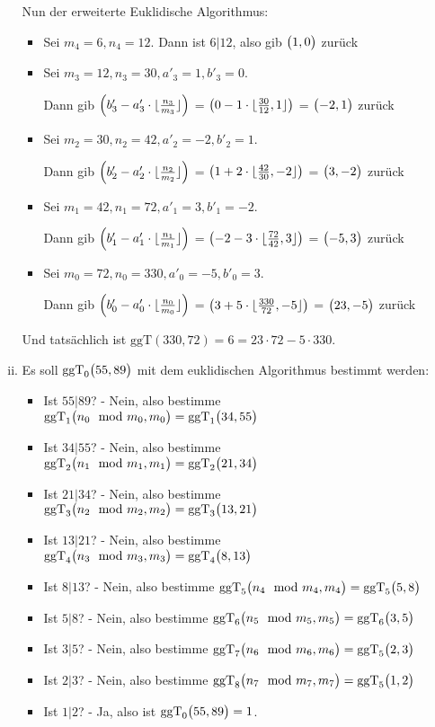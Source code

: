 \documentclass{scrreprt}
\newcommand{\ggT}[0]{\text{ggT}}
\DeclarePairedDelimiter{\floor}{\lfloor}{\rfloor}
\begin{document}
\begin{enumerate}[(a)]
\begin{enumerate}[(i)]
    Nun der erweiterte Euklidische Algorithmus:
    \begin{itemize}
    \item Sei $m_4 = 6, n_4 = 12$.
      Dann ist $6|12$, also gib $\qty\big(1, 0)$ zurück
    \item Sei $m_3 = 12, n_3 = 30, a'_3 = 1, b'_3 = 0$.

      Dann gib $\qty(b'_3 - a'_3 \cdot \floor{\frac{n_3}{m_3}})$ =
      $\qty(0 - 1 \cdot \floor{\frac{30}{12}, 1})$ =
      $\qty\big(-2, 1)$ zurück
    \item Sei $m_2 = 30, n_2 = 42, a'_2 = -2, b'_2 = 1$.

      Dann gib $\qty(b'_2 - a'_2 \cdot \floor{\frac{n_2}{m_2}})$ =
      $\qty(1 + 2 \cdot \floor{\frac{42}{30}, -2})$ =
      $\qty\big(3, -2)$ zurück
    \item Sei $m_1 = 42, n_1 = 72, a'_1 = 3, b'_1 = -2$.

      Dann gib $\qty(b'_1 - a'_1 \cdot \floor{\frac{n_1}{m_1}})$ =
      $\qty(-2 - 3 \cdot \floor{\frac{72}{42}, 3})$ =
      $\qty\big(-5, 3)$ zurück
    \item Sei $m_0 = 72, n_0 = 330, a'_0 = -5, b'_0 = 3$.

      Dann gib $\qty(b'_0 - a'_0 \cdot \floor{\frac{n_0}{m_0}})$ =
      $\qty(3 + 5 \cdot \floor{\frac{330}{72}, -5})$ =
      $\qty\big(23, -5)$ zurück
    \end{itemize}
    Und tatsächlich ist $\ggT(330, 72) = 6 = 23 \cdot 72 - 5 \cdot 330$.

  \newpage
  \item Es soll $\ggT_0\qty\big(55, 89)$ mit dem euklidischen Algorithmus
    bestimmt werden:
    \begin{itemize}
    \item Ist $55|89$? - Nein, also bestimme
      $\ggT_1\qty\big(n_0 \mod m_0, m_0) = \ggT_1\qty\big(34, 55)$
    \item Ist $34|55$? - Nein, also bestimme
      $\ggT_2\qty\big(n_1 \mod m_1, m_1) = \ggT_2\qty\big(21, 34)$
    \item Ist $21|34$? - Nein, also bestimme
      $\ggT_3\qty\big(n_2 \mod m_2, m_2) = \ggT_3\qty\big(13, 21)$
    \item Ist $13|21$? - Nein, also bestimme
      $\ggT_4\qty\big(n_3 \mod m_3, m_3) = \ggT_4\qty\big(8, 13)$
    \item Ist $8|13$? - Nein, also bestimme
      $\ggT_5\qty\big(n_4 \mod m_4, m_4) = \ggT_5\qty\big(5, 8)$
    \item Ist $5|8$? - Nein, also bestimme
      $\ggT_6\qty\big(n_5 \mod m_5, m_5) = \ggT_6\qty\big(3, 5)$
    \item Ist $3|5$? - Nein, also bestimme
      $\ggT_7\qty\big(n_6 \mod m_6, m_6) = \ggT_5\qty\big(2, 3)$
    \item Ist $2|3$? - Nein, also bestimme
      $\ggT_8\qty\big(n_7 \mod m_7, m_7) = \ggT_5\qty\big(1, 2)$
    \item Ist $1|2$? - Ja, also ist $\ggT_0\qty\big(55, 89) = 1$.
    \end{itemize}


\end{enumerate}
\end{enumerate}
\end{document}
